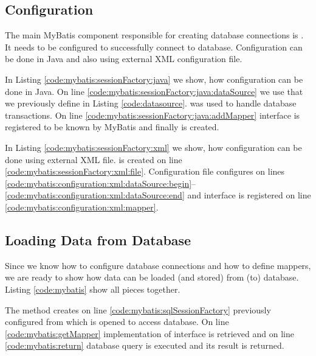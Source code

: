 \subsection{Configuration \label{frameworks:myBatis:configuration}}

The main MyBatis component responsible for creating database connections
is . It needs to be configured to successfully connect
to database. Configuration can be done in Java and also using external XML configuration file.

In Listing \ref{code:mybatis:sessionFactory:java} we show, how configuration can be
done in Java. On line \ref{code:mybatis:sessionFactory:java:dataSource} we use 
that we previously define in Listing \ref{code:datasource}.
 was used to handle database transactions.
On line \ref{code:mybatis:sessionFactory:java:addMapper}  interface is registered
to be known by MyBatis and finally  is created.

In Listing \ref{code:mybatis:sessionFactory:xml} we show, how configuration can be
done using external XML file.  is created
on line \ref{code:mybatis:sessionFactory:xml:file}. Configuration file
configures  on lines
\ref{code:mybatis:configuration:xml:dataSource:begin}--\ref{code:mybatis:configuration:xml:dataSource:end}
and  interface is registered on line \ref{code:mybatis:configuration:xml:mapper}.

\begin{figure}[p]
  
  \vspace{1cm}
  
\end{figure}




\subsection{Loading Data from Database \label{frameworks:myBatis:run}}

Since we know how to configure database connections and how to define mappers,
we are ready to show how data can be loaded (and stored) from (to) database.
Listing \ref{code:mybatis} show all pieces together.

The  method creates on line \ref{code:mybatis:sqlSessionFactory}
previously configured  from which  is opened to
access database. On line \ref{code:mybatis:getMapper} implementation
of  interface is retrieved and on line \ref{code:mybatis:return}
database query is executed and its result is returned.

